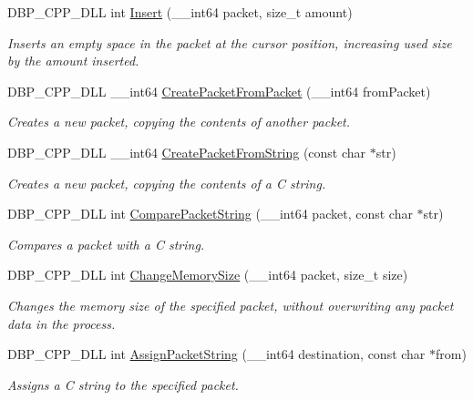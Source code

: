 \begin{DoxyCompactItemize}
DBP\_\-CPP\_\-DLL int \hyperlink{namespacemn_a30c227a71645e05ea87051ce801152d6}{Insert} (\_\-\_\-int64 packet, size\_\-t amount)
\begin{DoxyCompactList}\small\item\em Inserts an empty space in the packet at the cursor position, increasing used size by the amount inserted. \item\end{DoxyCompactList}\item 
DBP\_\-CPP\_\-DLL \_\-\_\-int64 \hyperlink{namespacemn_a41ac732588a37b91a93fc7783f9d0657}{CreatePacketFromPacket} (\_\-\_\-int64 fromPacket)
\begin{DoxyCompactList}\small\item\em Creates a new packet, copying the contents of another packet. \item\end{DoxyCompactList}\item 
DBP\_\-CPP\_\-DLL \_\-\_\-int64 \hyperlink{namespacemn_accd76b26c54e28e3ddce1fc4047ae57f}{CreatePacketFromString} (const char $\ast$str)
\begin{DoxyCompactList}\small\item\em Creates a new packet, copying the contents of a C string. \item\end{DoxyCompactList}\item 
DBP\_\-CPP\_\-DLL int \hyperlink{namespacemn_ac8aa2b803caa49c0acc6867a4bef5258}{ComparePacketString} (\_\-\_\-int64 packet, const char $\ast$str)
\begin{DoxyCompactList}\small\item\em Compares a packet with a C string. \item\end{DoxyCompactList}\item 
DBP\_\-CPP\_\-DLL int \hyperlink{namespacemn_a5cc568b9943fa823a3225e940c0733f9}{ChangeMemorySize} (\_\-\_\-int64 packet, size\_\-t size)
\begin{DoxyCompactList}\small\item\em Changes the memory size of the specified packet, without overwriting any packet data in the process. \item\end{DoxyCompactList}\item 
DBP\_\-CPP\_\-DLL int \hyperlink{namespacemn_a33df0d6b17fdd07525fb57e6f27bca88}{AssignPacketString} (\_\-\_\-int64 destination, const char $\ast$from)
\begin{DoxyCompactList}\small\item\em Assigns a C string to the specified packet. \item\end{DoxyCompactList}\item 

\end{DoxyCompactItemize}
